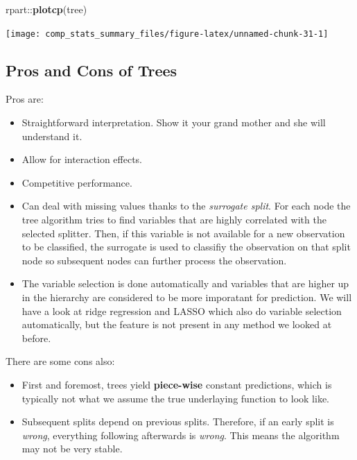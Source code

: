\documentclass[]{book}
\newenvironment{Shaded}{\begin{snugshade}}{\end{snugshade}}
\newcommand{\KeywordTok}[1]{\textcolor[rgb]{0.13,0.29,0.53}{\textbf{{#1}}}}
\newcommand{\NormalTok}[1]{{#1}}
\providecommand{\tightlist}{%
  \setlength{\itemsep}{0pt}\setlength{\parskip}{0pt}}
\begin{document}
\begin{Shaded}
\begin{Highlighting}[]
\NormalTok{rpart::}\KeywordTok{plotcp}\NormalTok{(tree)}
\end{Highlighting}
\end{Shaded}

\texttt{[image: comp\_stats\_summary\_files/figure-latex/unnamed-chunk-31-1]}

\subsection{Pros and Cons of Trees}\label{pros-and-cons-of-trees}

Pros are:

\begin{itemize}
\tightlist
\item
  Straightforward interpretation. Show it your grand mother and she will
  understand it.
\item
  Allow for interaction effects.
\item
  Competitive performance.
\item
  Can deal with missing values thanks to the \emph{surrogate split}. For
  each node the tree algorithm tries to find variables that are highly
  correlated with the selected splitter. Then, if this variable is not
  available for a new observation to be classified, the surrogate is
  used to classifiy the observation on that split node so subsequent
  nodes can further process the observation.
\item
  The variable selection is done automatically and variables that are
  higher up in the hierarchy are considered to be more imporatant for
  prediction. We will have a look at ridge regression and LASSO which
  also do variable selection automatically, but the feature is not
  present in any method we looked at before.
\end{itemize}

There are some cons also:

\begin{itemize}
\tightlist
\item
  First and foremost, trees yield \textbf{piece-wise} constant
  predictions, which is typically not what we assume the true
  underlaying function to look like.
\item
  Subsequent splits depend on previous splits. Therefore, if an early
  split is \emph{wrong}, everything following afterwards is
  \emph{wrong}. This means the algorithm may not be very stable.
\end{itemize}
\end{document}
